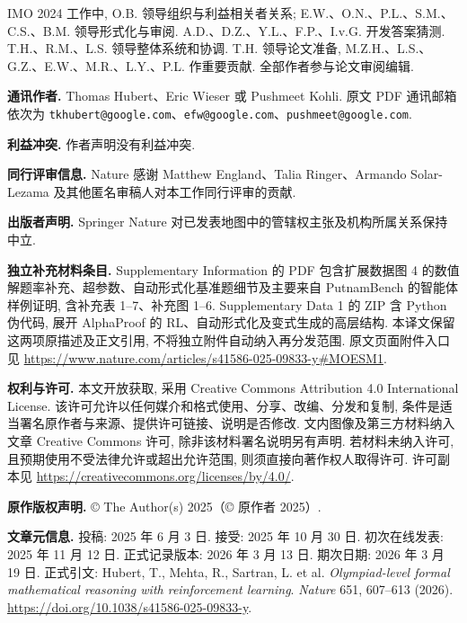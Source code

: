 IMO 2024 工作中, O.B. 领导组织与利益相关者关系; E.W.、O.N.、P.L.、S.M.、C.S.、B.M. 领导形式化与审阅. A.D.、D.Z.、Y.L.、F.P.、I.v.G. 开发答案猜测. T.H.、R.M.、L.S. 领导整体系统和协调. T.H. 领导论文准备, M.Z.H.、L.S.、G.Z.、E.W.、M.R.、L.Y.、P.L. 作重要贡献. 全部作者参与论文审阅编辑.

\noindent\textbf{通讯作者.} Thomas Hubert、Eric Wieser 或 Pushmeet Kohli. 原文 PDF 通讯邮箱依次为 \texttt{tkhubert@google.com}、\texttt{efw@google.com}、\texttt{pushmeet@google.com}.

\noindent\textbf{利益冲突.} 作者声明没有利益冲突.

\noindent\textbf{同行评审信息.} Nature 感谢 Matthew England、Talia Ringer、Armando Solar-Lezama 及其他匿名审稿人对本工作同行评审的贡献.

\noindent\textbf{出版者声明.} Springer Nature 对已发表地图中的管辖权主张及机构所属关系保持中立.

\noindent\textbf{独立补充材料条目.} Supplementary Information 的 PDF 包含扩展数据图 4 的数值解题率补充、超参数、自动形式化基准题细节及主要来自 PutnamBench 的智能体样例证明, 含补充表 1--7、补充图 1--6. Supplementary Data 1 的 ZIP 含 Python 伪代码, 展开 AlphaProof 的 RL、自动形式化及变式生成的高层结构. 本译文保留这两项原描述及正文引用, 不将独立附件自动纳入再分发范围. 原文页面附件入口见 \url{https://www.nature.com/articles/s41586-025-09833-y#MOESM1}.

\noindent\textbf{权利与许可.} 本文开放获取, 采用 Creative Commons Attribution 4.0 International License. 该许可允许以任何媒介和格式使用、分享、改编、分发和复制, 条件是适当署名原作者与来源、提供许可链接、说明是否修改. 文内图像及第三方材料纳入文章 Creative Commons 许可, 除非该材料署名说明另有声明. 若材料未纳入许可, 且预期使用不受法律允许或超出允许范围, 则须直接向著作权人取得许可. 许可副本见 \url{https://creativecommons.org/licenses/by/4.0/}.

\noindent\textbf{原作版权声明.} © The Author(s) 2025（© 原作者 2025）.

\noindent\textbf{文章元信息.} 投稿: 2025 年 6 月 3 日. 接受: 2025 年 10 月 30 日. 初次在线发表: 2025 年 11 月 12 日. 正式记录版本: 2026 年 3 月 13 日. 期次日期: 2026 年 3 月 19 日. 正式引文: Hubert, T., Mehta, R., Sartran, L. et al. \textit{Olympiad-level formal mathematical reasoning with reinforcement learning}. \textit{Nature} 651, 607--613 (2026). \url{https://doi.org/10.1038/s41586-025-09833-y}.


